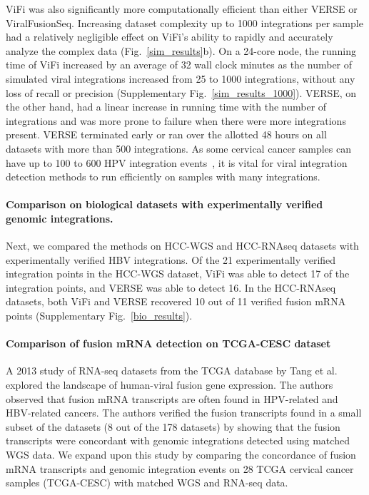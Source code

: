 \documentclass{bmcart}
\begin{document}
ViFi was also significantly more computationally efficient than either
VERSE or ViralFusionSeq. Increasing dataset complexity up to 1000
integrations per sample had a relatively negligible effect on ViFi's
ability to rapidly and accurately analyze the complex data
(Fig.~\ref{sim_results}b). On a 24-core node, the running time of ViFi
increased by an average of 32 wall clock minutes as the number of simulated viral
integrations increased from 25 to 1000 integrations, without any loss
of recall or precision (Supplementary Fig.~\ref{sim_results_1000}).  VERSE, on the
other hand, had a linear increase in running time with the number of
integrations and was more prone to failure when there were more
integrations present.  VERSE terminated early or ran over the allotted
48 hours on all datasets with more than 500 integrations.  As some
cervical cancer samples can have up to 100 to 600 HPV integration
events~\cite{Hu2015}, it is vital for viral integration detection
methods to run efficiently on samples with many integrations.

\paragraph{\textbf{Comparison on biological datasets with experimentally verified genomic integrations.}}  Next, we compared the methods on
HCC-WGS and HCC-RNAseq datasets with experimentally verified HBV
integrations.  Of the 21 experimentally verified integration points in
the HCC-WGS dataset, ViFi was able to detect 17 of the integration
points, and VERSE was able to detect 16.  In the HCC-RNAseq datasets,
both ViFi and VERSE recovered 10 out of 11 verified fusion mRNA points
(Supplementary Fig.~\ref{bio_results}).

\paragraph{\textbf{Comparison of fusion mRNA detection on TCGA-CESC dataset}}
A 2013 study of RNA-seq datasets from the TCGA database by Tang et
al.~\cite{Tang2013} explored the landscape of human-viral fusion gene
expression.  The authors observed that fusion mRNA transcripts are often
found in HPV-related and HBV-related cancers.  The authors verified
the fusion transcripts found in a small subset of the datasets (8 out
of the 178 datasets) by showing that the fusion transcripts were
concordant with genomic integrations detected using matched WGS data.  We
expand upon this study by comparing the concordance of fusion mRNA
transcripts and genomic integration events on 28 TCGA cervical cancer
samples (TCGA-CESC) with matched WGS and RNA-seq data.
\end{document}
